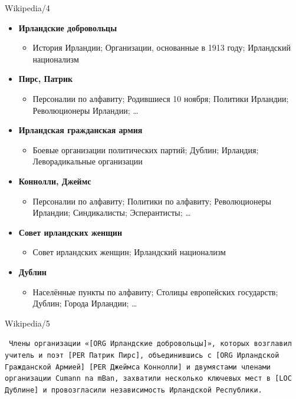 \documentclass[10pt, compress]{beamer}
\begin{document}
\begin{frame}{Wikipedia/4}

\begin{itemize}
\item \textbf{Ирландские добровольцы}
  \begin{itemize}
    \item История Ирландии; \alert<2>{Организации, основанные в 1913 году}; Ирландский национализм
  \end{itemize}
\item \textbf{Пирс, Патрик}
  \begin{itemize}
    \item \alert<2>{Персоналии по алфавиту}; Родившиеся 10 ноября; \alert<2>{Политики Ирландии}; \alert<2>{Революционеры Ирландии}; \ldots
  \end{itemize}
\item \textbf{Ирландская гражданская армия}
\begin{itemize}
  \item \alert<2>{Боевые организации политических партий}; Дублин; Ирландия; \alert<2>{Леворадикальные организации}
\end{itemize}
\item \textbf{Коннолли, Джеймс}
\begin{itemize}
  \item \alert<2>{Персоналии по алфавиту}; \alert<2>{Политики по алфавиту}; \alert<2>{Революционеры Ирландии}; \alert<2>{Синдикалисты}; \alert<2>{Эсперантисты}; \ldots
\end{itemize}
\item \textbf{Совет ирландских женщин}
\begin{itemize}
  \item Совет ирландских женщин; Ирландский национализм
\end{itemize}
\item \textbf{Дублин}
\begin{itemize}
  \item \alert<2>{Населённые пункты по алфавиту}; \alert<2>{Столицы европейских государств}; Дублин; \alert<2>{Города Ирландии}; \ldots
\end{itemize}
\end{itemize}

\end{frame}

\begin{frame}{Wikipedia/5}

{\tt
Члены организации «[{\sc ORG} Ирландские добровольцы]», которых возглавил 
учитель и поэт [{\sc PER} Патрик Пирс], объединившись с [{\sc ORG} Ирландской 
Гражданской Армией] [{\sc PER} Джеймса Коннолли] и двумястами членами 
организации \alert<2>{Cumann na mBan}, захватили несколько ключевых мест 
в [{\sc LOC} Дублине] и провозгласили независимость \alert<2>{Ирландской Республики}.
}

\end{frame}
\end{document}
